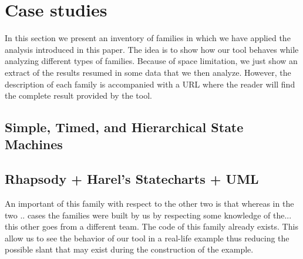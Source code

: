 \section{Case studies}
\label{sec:casestudies}

In this section we present an inventory of families in which we have applied the analysis introduced in this paper. The idea is to show how our tool behaves while analyzing different types of families. Because of space limitation, we just show an extract of the results resumed in some data that we then analyze. However, the description of each family is accompanied with a URL where the reader will find the complete result provided by the tool. 

\subsection{Simple, Timed, and Hierarchical State Machines}

\subsection{Rhapsody + Harel's Statecharts + UML}

An important of this family with respect to the other two is that whereas in the two .. cases the families were built by us by respecting some knowledge of the... this other goes from a different team. The code of this family already exists. This allow us to see the behavior of our tool in a real-life example thus reducing the possible slant that may exist during the construction of the example. 


